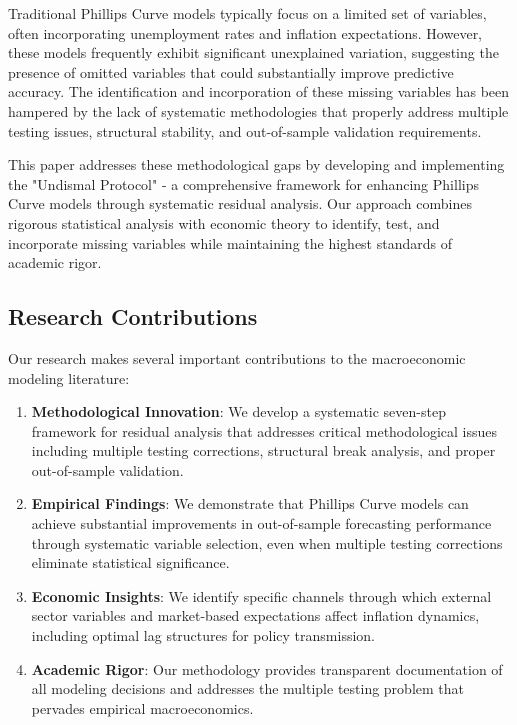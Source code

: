 \documentclass[12pt]{article}
\begin{document}
Traditional Phillips Curve models typically focus on a limited set of variables, often incorporating unemployment rates and inflation expectations. However, these models frequently exhibit significant unexplained variation, suggesting the presence of omitted variables that could substantially improve predictive accuracy. The identification and incorporation of these missing variables has been hampered by the lack of systematic methodologies that properly address multiple testing issues, structural stability, and out-of-sample validation requirements.

This paper addresses these methodological gaps by developing and implementing the "Undismal Protocol" - a comprehensive framework for enhancing Phillips Curve models through systematic residual analysis. Our approach combines rigorous statistical analysis with economic theory to identify, test, and incorporate missing variables while maintaining the highest standards of academic rigor.

\subsection{Research Contributions}

Our research makes several important contributions to the macroeconomic modeling literature:

\begin{enumerate}
\item \textbf{Methodological Innovation}: We develop a systematic seven-step framework for residual analysis that addresses critical methodological issues including multiple testing corrections, structural break analysis, and proper out-of-sample validation.

\item \textbf{Empirical Findings}: We demonstrate that Phillips Curve models can achieve substantial improvements in out-of-sample forecasting performance through systematic variable selection, even when multiple testing corrections eliminate statistical significance.

\item \textbf{Economic Insights}: We identify specific channels through which external sector variables and market-based expectations affect inflation dynamics, including optimal lag structures for policy transmission.

\item \textbf{Academic Rigor}: Our methodology provides transparent documentation of all modeling decisions and addresses the multiple testing problem that pervades empirical macroeconomics.
\end{enumerate}
\end{document}
